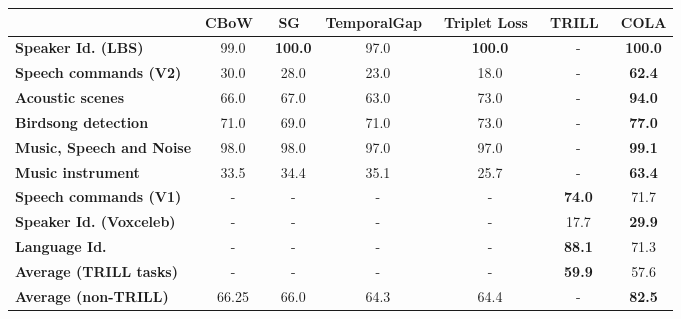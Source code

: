 \documentclass{article}
\newcommand{\ours}{COLA }
\begin{document}
\begin{table*}[!htbp]
\centering
\caption{Test accuracy (\%) of a linear classifier trained on top of \ours embeddings or baseline pre-trained representations.}
\vspace{0.1cm}
\footnotesize
\label{tab:results_sota}
\begin{tabular}{@{}lcccccc@{}}
\toprule
 &
\textbf{CBoW~\cite{tagliasacchi2019self, tagliasacchi2020pre}} &
\textbf{SG~\cite{tagliasacchi2019self, tagliasacchi2020pre}} &
\textbf{TemporalGap~\cite{tagliasacchi2019self, tagliasacchi2020pre}} &
\textbf{Triplet Loss~\cite{tagliasacchi2019self, tagliasacchi2020pre}} &
\textbf{TRILL~\cite{shor2020towards}} &
\textbf{\ours} \\ \midrule
\textbf{Speaker Id. (LBS)}       & 99.0  & \textbf{100.0} & 97.0 & \textbf{100.0} & -             & \textbf{100.0} \\
\textbf{Speech commands (V2)}    & 30.0  & 28.0           & 23.0 & 18.0           & -             & \textbf{62.4}  \\
\textbf{Acoustic scenes}         & 66.0  & 67.0           & 63.0 & 73.0           & -             & \textbf{94.0}  \\
\textbf{Birdsong detection}      & 71.0  & 69.0           & 71.0 & 73.0           & -             & \textbf{77.0}  \\
\textbf{Music, Speech and Noise} & 98.0  & 98.0           & 97.0 & 97.0           & -             & \textbf{99.1}  \\
\textbf{Music instrument}        & 33.5  & 34.4           & 35.1 & 25.7           & -             & \textbf{63.4}  \\
\textbf{Speech commands (V1)}    & -     & -              & -    & -              & \textbf{74.0} & 71.7           \\
\textbf{Speaker Id. (Voxceleb)}  & -     & -              & -    & -              & 17.7          & \textbf{29.9}  \\
\textbf{Language Id.}            & -     & -              & -    & -              & \textbf{88.1} & 71.3           \\ \midrule
\textbf{Average (TRILL tasks)}   & -     & -              & -    & -              & {\bf 59.9}    & 57.6           \\
\textbf{Average (non-TRILL)}     & 66.25 & 66.0           & 64.3 & 64.4           & -             & \textbf{82.5}  \\ \bottomrule
\end{tabular}

\end{table*}
\end{document}
